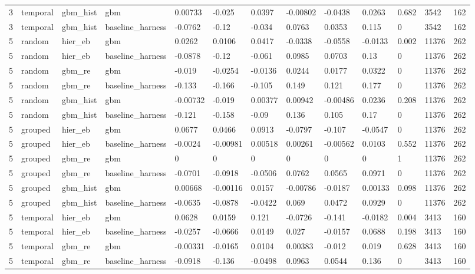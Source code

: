 \begin{tabular}{lllllllllllll}
3 & temporal & gbm\_hist & gbm & 0.00733 & -0.025 & 0.0397 & -0.00802 & -0.0438 & 0.0263 & 0.682 & 3542 & 162 \\
3 & temporal & gbm\_hist & baseline\_harness & -0.0762 & -0.12 & -0.034 & 0.0763 & 0.0353 & 0.115 & 0 & 3542 & 162 \\
5 & random & hier\_eb & gbm & 0.0262 & 0.0106 & 0.0417 & -0.0338 & -0.0558 & -0.0133 & 0.002 & 11376 & 262 \\
5 & random & hier\_eb & baseline\_harness & -0.0878 & -0.12 & -0.061 & 0.0985 & 0.0703 & 0.13 & 0 & 11376 & 262 \\
5 & random & gbm\_re & gbm & -0.019 & -0.0254 & -0.0136 & 0.0244 & 0.0177 & 0.0322 & 0 & 11376 & 262 \\
5 & random & gbm\_re & baseline\_harness & -0.133 & -0.166 & -0.105 & 0.149 & 0.121 & 0.177 & 0 & 11376 & 262 \\
5 & random & gbm\_hist & gbm & -0.00732 & -0.019 & 0.00377 & 0.00942 & -0.00486 & 0.0236 & 0.208 & 11376 & 262 \\
5 & random & gbm\_hist & baseline\_harness & -0.121 & -0.158 & -0.09 & 0.136 & 0.105 & 0.17 & 0 & 11376 & 262 \\
5 & grouped & hier\_eb & gbm & 0.0677 & 0.0466 & 0.0913 & -0.0797 & -0.107 & -0.0547 & 0 & 11376 & 262 \\
5 & grouped & hier\_eb & baseline\_harness & -0.0024 & -0.00981 & 0.00518 & 0.00261 & -0.00562 & 0.0103 & 0.552 & 11376 & 262 \\
5 & grouped & gbm\_re & gbm & 0 & 0 & 0 & 0 & 0 & 0 & 1 & 11376 & 262 \\
5 & grouped & gbm\_re & baseline\_harness & -0.0701 & -0.0918 & -0.0506 & 0.0762 & 0.0565 & 0.0971 & 0 & 11376 & 262 \\
5 & grouped & gbm\_hist & gbm & 0.00668 & -0.00116 & 0.0157 & -0.00786 & -0.0187 & 0.00133 & 0.098 & 11376 & 262 \\
5 & grouped & gbm\_hist & baseline\_harness & -0.0635 & -0.0878 & -0.0422 & 0.069 & 0.0472 & 0.0929 & 0 & 11376 & 262 \\
5 & temporal & hier\_eb & gbm & 0.0628 & 0.0159 & 0.121 & -0.0726 & -0.141 & -0.0182 & 0.004 & 3413 & 160 \\
5 & temporal & hier\_eb & baseline\_harness & -0.0257 & -0.0666 & 0.0149 & 0.027 & -0.0157 & 0.0688 & 0.198 & 3413 & 160 \\
5 & temporal & gbm\_re & gbm & -0.00331 & -0.0165 & 0.0104 & 0.00383 & -0.012 & 0.019 & 0.628 & 3413 & 160 \\
5 & temporal & gbm\_re & baseline\_harness & -0.0918 & -0.136 & -0.0498 & 0.0963 & 0.0544 & 0.136 & 0 & 3413 & 160 \\

\end{tabular}
